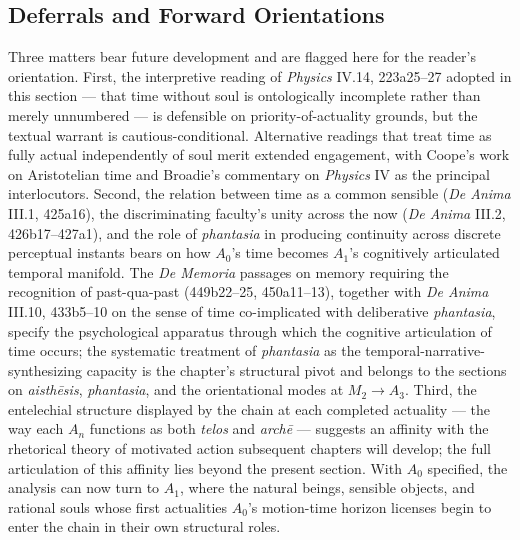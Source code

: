 \subsection*{Deferrals and Forward Orientations}

Three matters bear future development and are flagged here for the reader's orientation. First, the interpretive reading of \textit{Physics} IV.14, 223a25--27 adopted in this section --- that time without soul is ontologically incomplete rather than merely unnumbered --- is defensible on priority-of-actuality grounds, but the textual warrant is cautious-conditional. Alternative readings that treat time as fully actual independently of soul merit extended engagement, with Coope's work on Aristotelian time and Broadie's commentary on \textit{Physics} IV as the principal interlocutors. Second, the relation between time as a common sensible (\textit{De Anima} III.1, 425a16), the discriminating faculty's unity across the now (\textit{De Anima} III.2, 426b17--427a1), and the role of \textit{phantasia} in producing continuity across discrete perceptual instants bears on how $A_0$'s time becomes $A_1$'s cognitively articulated temporal manifold. The \textit{De Memoria} passages on memory requiring the recognition of past-qua-past (449b22--25, 450a11--13), together with \textit{De Anima} III.10, 433b5--10 on the sense of time co-implicated with deliberative \textit{phantasia}, specify the psychological apparatus through which the cognitive articulation of time occurs; the systematic treatment of \textit{phantasia} as the temporal-narrative-synthesizing capacity is the chapter's structural pivot and belongs to the sections on \textit{aisthēsis}, \textit{phantasia}, and the orientational modes at $M_2 \rightarrow A_3$. Third, the entelechial structure displayed by the chain at each completed actuality --- the way each $A_n$ functions as both \textit{telos} and \textit{archē} --- suggests an affinity with the rhetorical theory of motivated action subsequent chapters will develop; the full articulation of this affinity lies beyond the present section. With $A_0$ specified, the analysis can now turn to $A_1$, where the natural beings, sensible objects, and rational souls whose first actualities $A_0$'s motion-time horizon licenses begin to enter the chain in their own structural roles.
